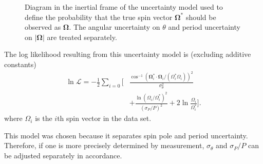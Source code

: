 \documentclass[fleqn,usenatbib]{mnras}
\renewcommand{\unit}[1]{\bm{\hat{#1}}}
\newcommand{\parens}[1]{\left( #1 \right)}
\begin{document}
\begin{figure}
  \centering
  \caption{Diagram in the inertial frame of the uncertainty model used to define the probability that the true spin vector $\bm \Omega^*$ should be observed as $\bm \Omega$. The angular uncertainty on $\theta$ and period uncertainty on $|\bm \Omega|$ are treated separately.}
  \label{fig:uncertainty-model}
\end{figure}

The log likelihood resulting from this uncertainty model is (excluding additive constants)
\begin{equation}
  \begin{split}
  \ln \mathcal{L} = -\frac{1}{2}\sum_{i = 0}\Bigg[&\frac{\cos^{-1} (\bm \Omega_i^* \cdot \bm \Omega_i/(\Omega_i^* \Omega_i))^2}{\sigma_\theta^2}\\
  &+\frac{\ln \parens{\Omega_i /\Omega_i^*}^2}{(\sigma_P / P)^2} + 2\ln\frac{\Omega_i}{\Omega_i^*}\Bigg].
  \end{split}
  \label{eqn:log-likelihood}
\end{equation}
where $\Omega_i$ is the $i$th spin vector in the data set.

This model was chosen because it separates spin pole and period uncertainty. Therefore, if one is more precisely determined by measurement, $\sigma_\theta$ and $\sigma_P / P$ can be adjusted separately in accordance.
\end{document}
